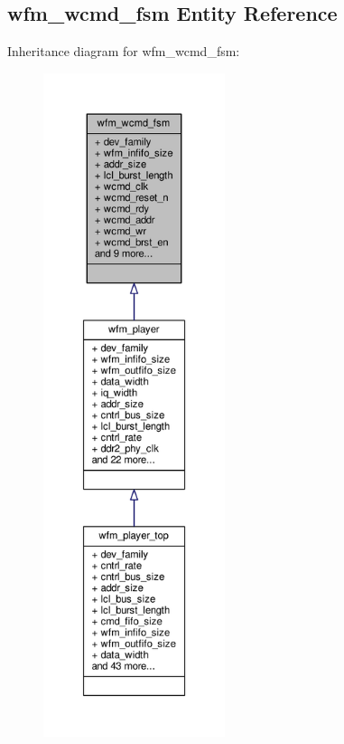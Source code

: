 \subsection{wfm\+\_\+wcmd\+\_\+fsm Entity Reference}
\label{classwfm__wcmd__fsm}


Inheritance diagram for wfm\+\_\+wcmd\+\_\+fsm\+:\nopagebreak
\begin{figure}[H]
\begin{center}
\leavevmode
\includegraphics[height=550pt]{de/d69/classwfm__wcmd__fsm__inherit__graph}
\end{center}
\end{figure}


